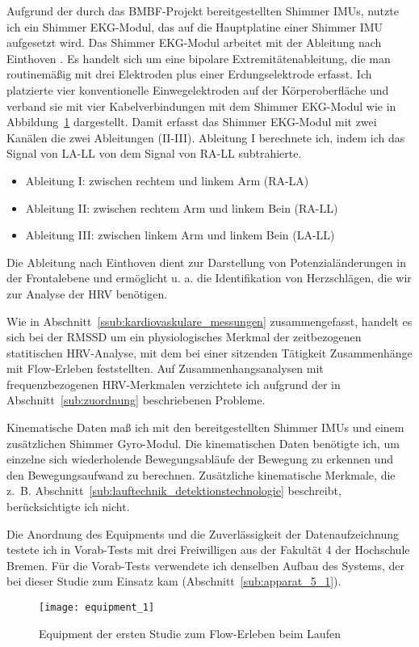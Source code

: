 Aufgrund der durch das \acs{BMBF}-Projekt bereitgestellten Shimmer \acp{IMU}, nutzte ich ein Shimmer EKG-Modul, das auf die Hauptplatine einer Shimmer \ac{IMU} aufgesetzt wird. Das Shimmer EKG-Modul arbeitet mit der Ableitung nach Einthoven \citep[][S.~85ff.]{Behrends2002}. Es handelt sich um eine bipolare Extremitätenableitung, die man routinemäßig mit drei Elektroden plus einer Erdungselektrode erfasst. Ich platzierte vier konventionelle Einwegelektroden auf der Körperoberfläche und verband sie mit vier Kabelverbindungen mit dem Shimmer EKG-Modul wie in Abbildung~\ref{fig:equipment_1} dargestellt. Damit erfasst das Shimmer EKG-Modul mit zwei Kanälen die zwei Ableitungen (II-III). Ableitung I berechnete ich, indem ich das Signal von LA-LL von dem Signal von RA-LL subtrahierte. 
\begin{itemize}
	\item Ableitung I: zwischen rechtem und linkem Arm (RA-LA) 
	\item Ableitung II: zwischen rechtem Arm und linkem Bein (RA-LL) 
	\item Ableitung III: zwischen linkem Arm und linkem Bein (LA-LL) 
\end{itemize}

Die Ableitung nach Einthoven dient zur Darstellung von Potenzialänderungen in der Frontalebene und ermöglicht u. a. die Identifikation von Herzschlägen, die wir zur Analyse der \ac{HRV} benötigen.

Wie in Abschnitt~\ref{ssub:kardiovaskulare_messungen} zusammengefasst, handelt es sich bei der \acs{RMSSD} um ein physiologisches Merkmal der zeitbezogenen statitischen \ac{HRV}-Analyse, mit dem \citet{Keller2011} bei einer sitzenden Tätigkeit Zusammenhänge mit Flow-Erleben feststellten. Auf Zusammenhangsanalysen mit frequenzbezogenen \ac{HRV}-Merkmalen verzichtete ich aufgrund der in Abschnitt~\ref{sub:zuordnung} beschriebenen Probleme.

Kinematische Daten maß ich mit den bereitgestellten Shimmer \acp{IMU} und einem zusätzlichen Shimmer Gyro-Modul. Die kinematischen Daten benötigte ich, um einzelne sich wiederholende Bewegungsabläufe der Bewegung zu erkennen und den Bewegungsaufwand zu berechnen. Zusätzliche kinematische Merkmale, die z.~B. Abschnitt~\ref{sub:lauftechnik_detektionstechnologie} beschreibt, berücksichtigte ich nicht.

Die Anordnung des Equipments und die Zuverlässigkeit der Datenaufzeichnung testete ich in Vorab-Tests mit drei Freiwilligen aus der Fakultät 4 der Hochschule Bremen. Für die Vorab-Tests verwendete ich denselben Aufbau des Systems, der bei dieser Studie zum Einsatz kam (Abschnitt~\ref{sub:apparat_5_1}). 
\begin{figure}
	[!htb] \centering 
	\texttt{[image: equipment\_1]} \caption[Equipment der ersten Studie zum Flow-Erleben beim Laufen]{Equipment der ersten Studie zum Flow-Erleben beim Laufen} \label{fig:equipment_1} 
\end{figure}

